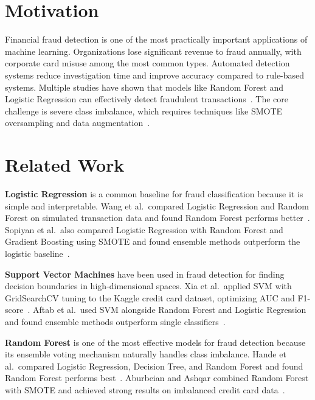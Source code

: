 \documentclass{article}
\begin{document}
\section{Motivation}

Financial fraud detection is one of the most practically important
applications of machine learning. Organizations lose significant revenue
to fraud annually, with corporate card misuse among the most common types.
Automated detection systems reduce investigation time and improve accuracy
compared to rule-based systems. Multiple studies have shown that models
like Random Forest and Logistic Regression can effectively detect
fraudulent transactions~\cite{wang2023credit,hande2019credit}. The core
challenge is severe class imbalance, which requires techniques like SMOTE
oversampling and data augmentation~\cite{khalid2024enhancing,strelcenia2023improving}.

\section{Related Work}

\textbf{Logistic Regression} is a common baseline for fraud
classification because it is simple and interpretable. Wang et al.\
compared Logistic Regression and Random Forest on simulated transaction
data and found Random Forest performs better~\cite{wang2023credit}.
Sopiyan et al.\ also compared Logistic Regression with Random Forest and
Gradient Boosting using SMOTE and found ensemble methods outperform the
logistic baseline~\cite{sopiyan2022fraud}.

\textbf{Support Vector Machines} have been used in fraud detection for
finding decision boundaries in high-dimensional spaces. Xia et al.\
applied SVM with GridSearchCV tuning to the Kaggle credit card dataset,
optimizing AUC and F1-score~\cite{xia2022credit}. Aftab et al.\ used SVM
alongside Random Forest and Logistic Regression and found ensemble methods
outperform single classifiers~\cite{aftab2023fraud}.

\textbf{Random Forest} is one of the most effective models for fraud
detection because its ensemble voting mechanism naturally handles class
imbalance. Hande et al.\ compared Logistic Regression, Decision Tree, and
Random Forest and found Random Forest performs best~\cite{hande2019credit}.
Aburbeian and Ashqar combined Random Forest with SMOTE and achieved strong
results on imbalanced credit card data~\cite{aburbeian2023credit}.
\end{document}
